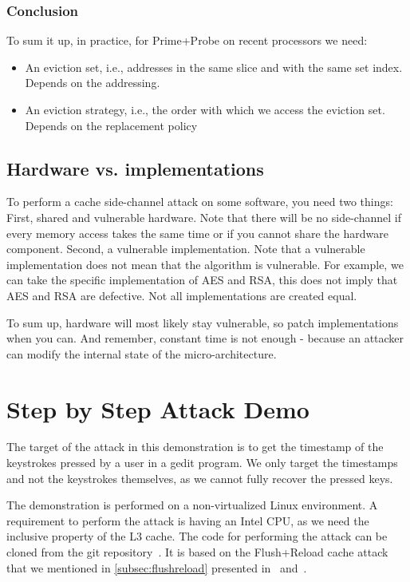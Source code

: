 \subsubsection{Conclusion}
\label{subsubsec:Conclusion}
To sum it up, in practice, for Prime+Probe on recent processors we need:
\begin{itemize}
    \item An eviction set, i.e., addresses in the same slice and with the same
    set index. Depends on the addressing.
    \item An eviction strategy, i.e., the order with which we access the
    eviction set. Depends on the replacement policy
\end{itemize}

\subsection{Hardware vs. implementations}
\label{subsec:Hardwarevsimplementations}

To perform a cache side-channel attack on some software, you need two things:
First, shared and vulnerable hardware. Note that there will be no side-channel
if every memory access takes the same time or if you cannot share the hardware
component. Second, a vulnerable implementation. Note that a vulnerable
implementation does not mean that the algorithm is vulnerable. For example, we
can take the specific implementation of AES and RSA, this does not imply that AES and RSA are defective. Not all implementations are created equal.

To sum up, hardware will most likely stay vulnerable, so patch implementations
when you can. And remember, constant time is not enough - because an attacker
can modify the internal state of the micro-architecture.

\section{Step by Step Attack Demo} %
\label{sec:stepbystepattack}

The target of the attack in this demonstration is to get the timestamp of the
keystrokes pressed by a user in a gedit program. We only target the timestamps
and not the keystrokes themselves, as we cannot fully recover the
pressed keys.

The demonstration is performed on a non-virtualized Linux environment. A
requirement to perform the attack is having an Intel CPU, as we need the
inclusive property of the L3 cache. The code for performing the attack can be cloned
from the git repository~\cite{GitClementine}. It is based on the Flush+Reload
cache attack that we mentioned in \cref{subsec:flushreload} presented
in~\cite{Yarom2014} and~\cite{Gruss2015}.

